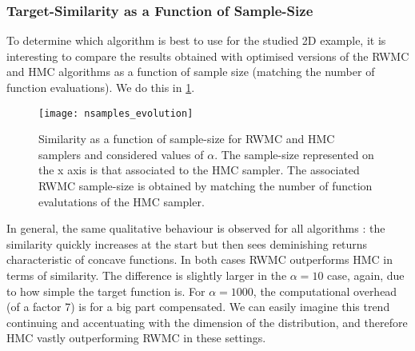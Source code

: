 \documentclass[a4paper, 12pt,oneside]{article}
\begin{document}
		\subsubsection{Target-Similarity as a Function of Sample-Size}\label{sec:target-similarity}
		To determine which algorithm is best to use for the studied 2D example, it is interesting to compare the results obtained with optimised versions of the RWMC and HMC algorithms as a function of sample size (matching the number of function evaluations). We do this in \ref{fig:nsamples-evolution}.
		\begin{figure}[htb]
			\centering
				\vspace{0em}
				\texttt{[image: nsamples\_evolution]}
				\caption{Similarity as a function of sample-size for RWMC and HMC samplers and considered values of $\alpha$. The sample-size represented on the x axis is that associated to the HMC sampler. The associated RWMC sample-size is obtained by matching the number of function evalutations of the HMC sampler.}
				\label{fig:nsamples-evolution}
		\end{figure}
		In general, the same qualitative behaviour is observed for all algorithms : the similarity quickly increases at the start but then sees deminishing returns characteristic of concave functions. In both cases RWMC outperforms HMC in terms of similarity. The difference is slightly larger in the $\alpha=10$ case, again, due to how simple the target function is. For $\alpha=1000$, the computational overhead (of a factor 7) is for a big part compensated. We can easily imagine this trend continuing and accentuating with the dimension of the distribution, and therefore HMC vastly outperforming RWMC in these settings.
\end{document}
